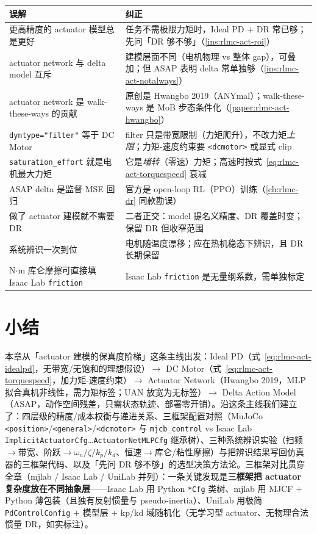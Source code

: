 \begin{center}
\small
\begin{tabular}{@{}p{5.0cm}p{8.2cm}@{}}
\toprule
误解 & 纠正 \\
\midrule
更高精度的 actuator 模型总是更好 & 任务不需极限力矩时，Ideal PD $+$ DR 常已够；先问「DR 够不够」（\cref{ins:rlmc-act-roi}） \\
actuator network 与 delta model 互斥 & 建模层面不同（电机物理 vs 整体 gap），可叠加；但 ASAP 表明 delta 常单独够（\cref{ins:rlmc-act-notalways}） \\
actuator network 是 walk-these-ways 的贡献 & 原创是 Hwangbo 2019（ANYmal）；walk-these-ways 是 MoB 步态条件化（\cref{paper:rlmc-act-hwangbo}） \\
\verb|dyntype="filter"| 等于 DC Motor & filter 只是带宽限制（力矩爬升），不改力矩\emph{上限}；力矩-速度约束要 \verb|<dcmotor>| 或显式 clip \\
\verb|saturation_effort| 就是电机最大力矩 & 它是\emph{堵转}（零速）力矩；高速时按式~\eqref{eq:rlmc-act-torquespeed} 衰减 \\
ASAP delta 是监督 MSE 回归 & 官方是 open-loop RL（PPO）训练（\cref{ch:rlmc-dr} 同款勘误） \\
做了 actuator 建模就不需要 DR & 二者正交：model 提名义精度、DR 覆盖时变；保留 DR 但收窄范围 \\
系统辨识一次到位 & 电机随温度漂移；应在热机稳态下辨识，且 DR 长期保留 \\
N$\cdot$m 库仑摩擦可直接填 Isaac Lab \verb|friction| & Isaac Lab \verb|friction| 是无量纲系数，需单独标定 \\
\bottomrule
\end{tabular}
\end{center}

\section*{小结}
\label{sec:rlmc-act-summary}

本章从「actuator 建模的保真度阶梯」这条主线出发：Ideal PD（式~\eqref{eq:rlmc-act-idealpd}，无带宽/无饱和的理想假设）$\to$ DC Motor（式~\eqref{eq:rlmc-act-torquespeed}，加力矩-速度约束）$\to$ Actuator Network（Hwangbo 2019，MLP 拟合真机非线性，需力矩标签；UAN 放宽为无标签）$\to$ Delta Action Model（ASAP，动作空间残差，只需状态轨迹、部署零开销）。沿这条主线我们建立了：四层级的精度/成本权衡与递进关系、三框架配置对照（MuJoCo \verb|<position>|/\verb|<general>|/\verb|<dcmotor>| 与 \verb|mjcb_control| vs Isaac Lab \verb|ImplicitActuatorCfg|…\verb|ActuatorNetMLPCfg| 继承树）、三种系统辨识实验（扫频$\to$带宽、阶跃$\to\omega_n/\zeta/k_p/k_d$、恒速$\to$库仑/粘性摩擦）与把辨识结果写回仿真器的三框架代码、以及「先问 DR 够不够」的选型决策方法论。三框架对比贯穿全章（mjlab / Isaac Lab / UniLab 并列）：一条关键发现是\textbf{三框架把 actuator 复杂度放在不同抽象层}——Isaac Lab 用 Python \verb|*Cfg| 类树、mjlab 用 MJCF $+$ Python 薄包装（且独有反射惯量与 pseudo-inertia）、UniLab 用极简 \verb|PdControlConfig| $+$ 模型层 $+$ kp/kd 域随机化（无学习型 actuator、无物理合法惯量 DR，如实标注）。

